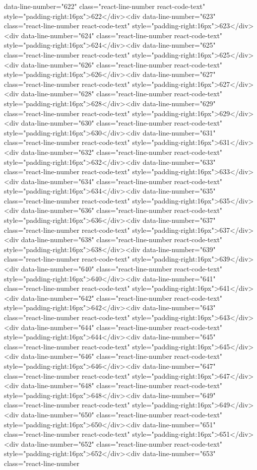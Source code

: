 data-line-number="622" class="react-line-number react-code-text" style="padding-right:16px">622</div><div data-line-number="623" class="react-line-number react-code-text" style="padding-right:16px">623</div><div data-line-number="624" class="react-line-number react-code-text" style="padding-right:16px">624</div><div data-line-number="625" class="react-line-number react-code-text" style="padding-right:16px">625</div><div data-line-number="626" class="react-line-number react-code-text" style="padding-right:16px">626</div><div data-line-number="627" class="react-line-number react-code-text" style="padding-right:16px">627</div><div data-line-number="628" class="react-line-number react-code-text" style="padding-right:16px">628</div><div data-line-number="629" class="react-line-number react-code-text" style="padding-right:16px">629</div><div data-line-number="630" class="react-line-number react-code-text" style="padding-right:16px">630</div><div data-line-number="631" class="react-line-number react-code-text" style="padding-right:16px">631</div><div data-line-number="632" class="react-line-number react-code-text" style="padding-right:16px">632</div><div data-line-number="633" class="react-line-number react-code-text" style="padding-right:16px">633</div><div data-line-number="634" class="react-line-number react-code-text" style="padding-right:16px">634</div><div data-line-number="635" class="react-line-number react-code-text" style="padding-right:16px">635</div><div data-line-number="636" class="react-line-number react-code-text" style="padding-right:16px">636</div><div data-line-number="637" class="react-line-number react-code-text" style="padding-right:16px">637</div><div data-line-number="638" class="react-line-number react-code-text" style="padding-right:16px">638</div><div data-line-number="639" class="react-line-number react-code-text" style="padding-right:16px">639</div><div data-line-number="640" class="react-line-number react-code-text" style="padding-right:16px">640</div><div data-line-number="641" class="react-line-number react-code-text" style="padding-right:16px">641</div><div data-line-number="642" class="react-line-number react-code-text" style="padding-right:16px">642</div><div data-line-number="643" class="react-line-number react-code-text" style="padding-right:16px">643</div><div data-line-number="644" class="react-line-number react-code-text" style="padding-right:16px">644</div><div data-line-number="645" class="react-line-number react-code-text" style="padding-right:16px">645</div><div data-line-number="646" class="react-line-number react-code-text" style="padding-right:16px">646</div><div data-line-number="647" class="react-line-number react-code-text" style="padding-right:16px">647</div><div data-line-number="648" class="react-line-number react-code-text" style="padding-right:16px">648</div><div data-line-number="649" class="react-line-number react-code-text" style="padding-right:16px">649</div><div data-line-number="650" class="react-line-number react-code-text" style="padding-right:16px">650</div><div data-line-number="651" class="react-line-number react-code-text" style="padding-right:16px">651</div><div data-line-number="652" class="react-line-number react-code-text" style="padding-right:16px">652</div><div data-line-number="653" class="react-line-number 